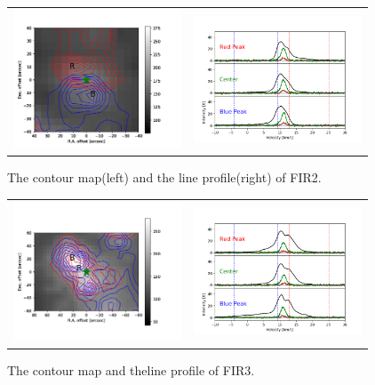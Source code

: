 \documentclass[twoside,11pt]{gshs_thesis}
\begin{document}
\begin{figure}[h!]
	\begin{center}
		\begin{tabular}{cc}
			\includegraphics[width=5cm]{Orion_12CO2-1_FIR2_rbcontour_400_modified.png} &   \includegraphics[width=5cm]{Orion_12CO2-1_FIR2_line_profile_400.png} \\
		\end{tabular}
		\caption{The contour map(left) and the line profile(right) of FIR2. }
	\end{center}
\end{figure}

\begin{figure}[h!]
	\begin{center}
		\begin{tabular}{cc}
			\includegraphics[width=5cm]{Orion_12CO2-1_FIR3_rbcontour_400_modified.png} &   \includegraphics[width=5cm]{Orion_12CO2-1_FIR3_line_profile_400.png}\\
		\end{tabular}
		\caption{The contour map and theline profile of FIR3. }
	\end{center}
\end{figure}
\end{document}

